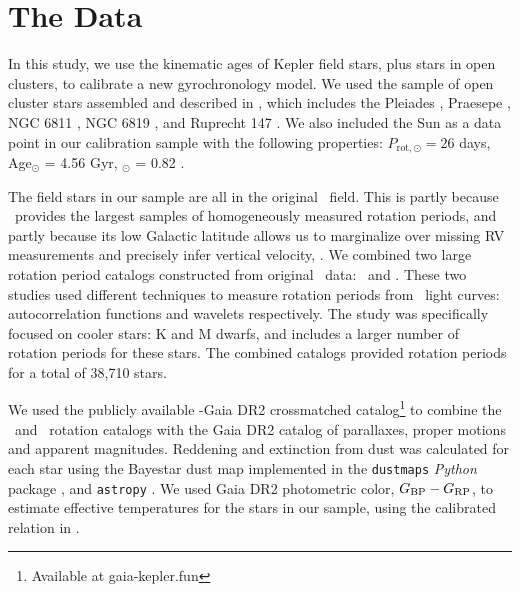 \section{The Data}
\label{sec:data}

In this study, we use the kinematic ages of Kepler field stars, plus stars in
open clusters, to calibrate a new gyrochronology model.
We used the sample of open cluster stars assembled and described in
\citet{curtis2020}, which includes the Pleiades \citep[120 Myr][]{rebull2016},
Praesepe \citep[670 Myr][]{douglas2017, douglas2019},
NGC 6811 \citep[1.0 Gyr][]{curtis2019}, NGC 6819
\citep[2.5 Gyr][]{meibom2015}, and Ruprecht 147 \citep[2.7 Gyr][]{curtis2020}.
We also included the Sun as a data point in our calibration sample with the
following properties: $P_\mathrm{rot, \odot} = 26$ days, Age$_\odot$ = 4.56
Gyr, \gcolor$_\odot$ = 0.82 \citep{citations}.

The field stars in our sample are all in the original \kepler\ field.
This is partly because \kepler\ provides the largest samples of homogeneously
measured rotation periods, and partly because its low Galactic latitude allows
us to marginalize over missing RV measurements and precisely infer vertical
velocity, \vz.
We combined two large rotation period catalogs constructed from original
\kepler\ data: \mct\ and \sant.
These two studies used different techniques to measure rotation periods from
\kepler\ light curves: autocorrelation functions and wavelets respectively.
The \citet{santos2019} study was specifically focused on cooler stars: K and M
dwarfs, and includes a larger number of rotation periods for these stars.
The combined catalogs provided rotation periods for a total of 38,710 stars.

We used the publicly available \kepler-Gaia DR2 crossmatched
catalog\footnote{Available at gaia-kepler.fun} to combine the \mct\ and \sant\
rotation catalogs with the Gaia DR2 catalog of parallaxes, proper motions
and apparent magnitudes.
Reddening and extinction from dust was calculated for each star using the
Bayestar dust map implemented in the {\tt dustmaps} {\it Python} package
\citep{green2018}, and {\tt astropy} \citep{astropy2013, astropy2018}.
We used Gaia DR2 photometric color, $G_{\rm BP} - G_{\rm RP}$, to estimate
effective temperatures for the stars in our sample, using the calibrated
relation in \citet{curtis2020}.

